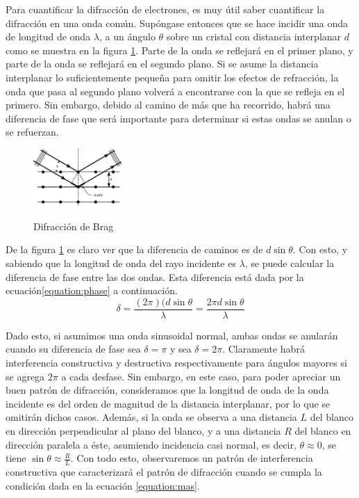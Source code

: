 \documentclass[%
 reprint,
 amsmath,amssymb,
 aps,
]{revtex4-1}
\begin{document}
Para cuantificar la difracción de electrones, es muy útil saber cuantificar la difracción en una onda común. Supóngase entonces que se hace incidir una onda de longitud de onda $\lambda$, a un ángulo $\theta$ sobre un cristal con distancia interplanar $d$ como se muestra en la figura \ref{fig:difraccion}. Parte de la onda se reflejará en el primer plano, y parte de la onda se reflejará en el segundo plano. Si se asume la distancia interplanar lo suficientemente pequeña para omitir los efectos de refracción, la onda que pasa al segundo plano volverá a encontrarse con la que se refleja en el primero. Sin embargo, debido al camino de más que ha recorrido, habrá una diferencia de fase que será importante para determinar si estas ondas se anulan o se refuerzan.\\ 


\begin{figure}[h]
\caption{Difracción de Brag}
\centering
\includegraphics[width=0.30\textwidth]{difraction}
\label{fig:difraccion}
\end{figure}

De la figura \ref{fig:difraccion} es claro ver que la diferencia de caminos es de $d\sin{\theta}$. Con esto, y sabiendo que la longitud de onda del rayo incidente es $\lambda$, se puede calcular la diferencia de fase entre las dos ondas. Esta diferencia está dada por la ecuación\ref{equation:phase} a continuación.\\

\begin{equation}
\delta = \frac{(2\pi)(d\sin{\theta}}{\lambda} = \frac{2\pi d\sin{\theta}}{\lambda}
\label{equation:phase}
\end{equation}

Dado esto, si asumimos una onda sinusoidal normal, ambas ondas se anularán cuando su diferencia de fase sea $\delta = \pi$ y sea $\delta = 2\pi$. Claramente habrá interferencia constructiva y destructiva respectivamente para ángulos mayores si se agrega $2\pi$ a cada desfase. Sin embargo, en este caso, para poder apreciar un buen patrón de difracción, consideramos que la longitud de onda de la onda incidente es del orden de magnitud de la distancia interplanar, por lo que se omitirán dichos casos. Además, si la onda se observa a una distancia $L$ del blanco en dirección perpendicular al plano del blanco, y a una distancia $R$ del blanco en dirección paralela a éste, asumiendo incidencia casi normal, es decir, $\theta \approx 0$, se tiene $\sin{\theta} \approx \frac{R}{L}$. Con todo esto, observaremos un patrón de interferencia constructiva que caracterizará el patrón de difracción cuando se cumpla la condición dada en la ecuación \ref{equation:mas}.\\
\end{document}
